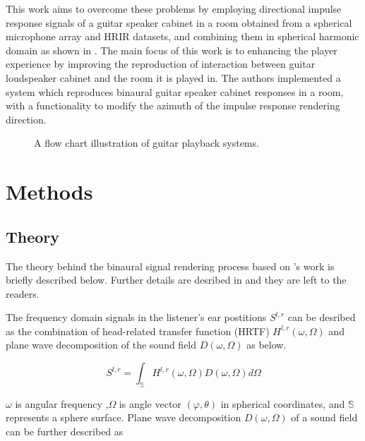 \documentclass[convention,e-brief]{aesconf-current}
\begin{document}
This work aims to overcome these problems by employing directional impulse response signals of a guitar speaker cabinet in a room obtained from a spherical microphone array and HRIR datasets, and combining them in spherical harmonic domain as shown in \cite{Andersson2017-qg}.
The main focus of this work is to enhancing the player experience by improving the reproduction of interaction between guitar loudspeaker cabinet and the room it is played in.
The authors implemented a system which reproduces binaural guitar speaker cabinet responses in a room, with a functionality to modify the azimuth of the impulse response rendering direction.

\begin{figure}
    \begin{center}
        \caption{A flow chart illustration of guitar playback systems. } \label{fig:diag}
    \end{center}
\end{figure}



\section{Methods}

\subsection{Theory}
The theory behind the binaural signal rendering process based on \citet{Andersson2017-qg}'s work is briefly described below.
Further details are desribed in \cite{Andersson2017-qg} and they are left to the readers.

The frequency domain signals in the listener's ear postitions $S^{l, r}$ can be desribed as the combination of head-related transfer function (HRTF) $H^{l, r}(\omega, \Omega)$ and plane wave decomposition of the sound field $D(\omega, \Omega)$ as below.

\begin{equation}
    \label{hrtf_pw}
    S^{l, r}=\int_{\mathbb{S}} H^{l, r}(\omega, \Omega) D(\omega, \Omega) d \Omega
\end{equation}

$\omega$ is angular frequency ,$\Omega$ is angle vector $(\varphi, \theta)$ in spherical coordinates, and $\mathbb{S}$ represents a sphere surface.
Plane wave decomposition $D(\omega, \Omega)$ of a sound field can be further described as
\end{document}
